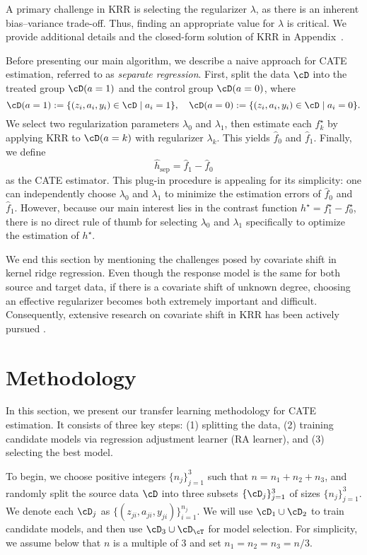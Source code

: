 \documentclass[12pt,a4paper,pdftex,onepage]{article}
\begin{document}
A primary challenge in KRR is selecting the regularizer \(\lambda\), as there is an inherent bias--variance trade-off.  
Thus, finding an appropriate value for \(\lambda\) is critical.  
We provide additional details and the closed-form solution of KRR in Appendix~.


Before presenting our main algorithm, we describe a naive approach for CATE estimation, referred to as \emph{separate regression}.  
First, split the data \(\cD\) into the treated group \(\cD(a=1)\) and the control group \(\cD(a=0)\), where
\[
\cD(a=1) := \{(z_i, a_i, y_i) \in \cD \mid a_i =1 \}, 
\quad
\cD(a=0) := \{(z_i, a_i, y_i) \in \cD \mid a_i =0 \}.
\]
We select two regularization parameters \(\lambda_0\) and \(\lambda_1\), then estimate each \(f_k^\star\) by applying KRR to \(\cD(a=k)\) with regularizer \(\lambda_k\). 
This yields \(\hat{f}_0\) and \(\hat{f}_1\).  
Finally, we define 
\[
\hat{h}_{\operatorname{sep}} = \hat{f}_1 - \hat{f}_0
\]
as the CATE estimator.  
This plug-in procedure is appealing for its simplicity: one can independently choose \(\lambda_0\) and \(\lambda_1\) to minimize the estimation errors of \(\hat{f}_0\) and \(\hat{f}_1\).  However, because our main interest lies in the contrast function \(h^\star = f^\star_1 - f^\star_0\), there is no direct rule of thumb for selecting \(\lambda_0\) and \(\lambda_1\) specifically to optimize the estimation of \(h^\star\).  

We end this section by mentioning the challenges posed by covariate shift in kernel ridge regression. 
Even though the response model is the same for both source and target data, if there is a covariate shift of unknown degree, choosing an effective regularizer becomes both extremely important and difficult. Consequently, extensive research on covariate shift in KRR has been actively pursued \citep{ma2023optimally,wang2023pseudo,chen2024high,PDT24}.



\section{Methodology}\label{section; methodology}

In this section, we present our transfer learning methodology for CATE estimation. It consists of three key steps: 
(1) splitting the data, 
(2) training candidate models via regression adjustment learner (RA learner), 
and (3) selecting the best model.

To begin, we choose positive integers $\{ n_j \}_{j=1}^3$ such that $n = n_1 + n_2 + n_3$, and randomly split the source data $\cD$ into three subsets $\{\cD_j\}_{j=1}^3$ of sizes $\{ n_j \}_{j=1}^3$.  
We denote each $\cD_j$ as $\{ (z_{ji}, a_{ji}, y_{ji}) \}_{i=1}^{n_j}$.  
We will use $\cD_1 \cup \cD_2$ to train candidate models, and then use $\cD_3 \cup \cD_{\cT}$ for model selection.  
For simplicity, we assume below that $n$ is a multiple of 3 and set $n_1 = n_2 = n_3 = n/3$.
\end{document}
